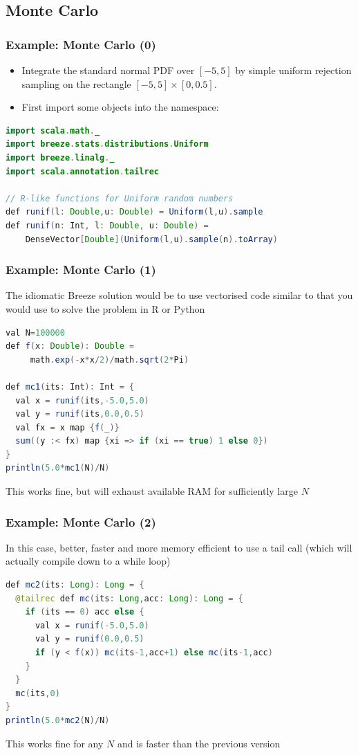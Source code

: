 \documentclass[mathserif,handout]{beamer}
\begin{document}
\subsection{Monte Carlo}

\begin{frame}[fragile]
\frametitle{Example: Monte Carlo (0)}
\begin{itemize}
\item Integrate the standard normal PDF over $[-5,5]$ by simple uniform rejection sampling on the rectangle $[-5,5]\times[0,0.5]$.
\item First import some objects into the namespace:
\end{itemize}
{\small
\begin{lstlisting}[language=java]
import scala.math._
import breeze.stats.distributions.Uniform
import breeze.linalg._
import scala.annotation.tailrec

// R-like functions for Uniform random numbers
def runif(l: Double,u: Double) = Uniform(l,u).sample
def runif(n: Int, l: Double, u: Double) = 
    DenseVector[Double](Uniform(l,u).sample(n).toArray)
\end{lstlisting}} 
\end{frame}

\begin{frame}[fragile]
\frametitle{Example: Monte Carlo (1)}
The idiomatic Breeze solution would be to use vectorised code similar to that you would use to solve the problem in R or Python
{\small
\begin{lstlisting}[language=java]
val N=100000
def f(x: Double): Double = 
     math.exp(-x*x/2)/math.sqrt(2*Pi)

def mc1(its: Int): Int = {
  val x = runif(its,-5.0,5.0)
  val y = runif(its,0.0,0.5)
  val fx = x map {f(_)}
  sum((y :< fx) map {xi => if (xi == true) 1 else 0})
}
println(5.0*mc1(N)/N)
\end{lstlisting}}
This works fine, but will exhaust available RAM for sufficiently large $N$
\end{frame}

\begin{frame}[fragile]
\frametitle{Example: Monte Carlo (2)}
In this case, better, faster and more memory efficient to use a tail call (which will actually compile down to a while loop)
{\small
\begin{lstlisting}[language=java]
def mc2(its: Long): Long = {
  @tailrec def mc(its: Long,acc: Long): Long = {
    if (its == 0) acc else {
      val x = runif(-5.0,5.0)
      val y = runif(0.0,0.5)
      if (y < f(x)) mc(its-1,acc+1) else mc(its-1,acc)
    }  
  }
  mc(its,0)
}
println(5.0*mc2(N)/N)
\end{lstlisting}}
This works fine for any $N$ and is faster than the previous version
\end{frame}
\end{document}
